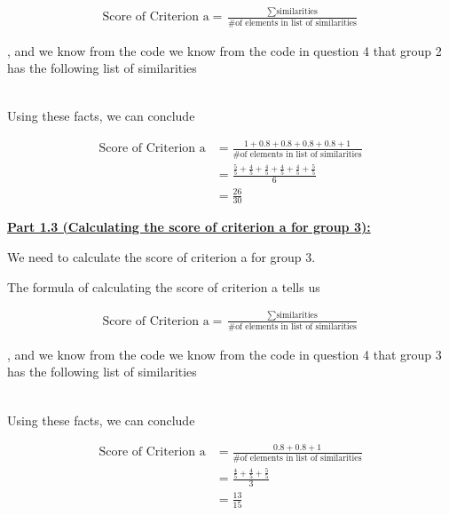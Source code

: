 \documentclass[12pt]{article}
\begin{document}
\begin{itemize}
    \begin{align}
        \text{Score of Criterion a} = \frac{\sum \text{similarities}}{\text{\# of elements in list of similarities}}
    \end{align}

    , and we know from the code we know from the code in question 4 that group 2 has the following
    list of similarities

    \begin{align}
        [1,0.8,0.8,0.8,0.8,1]
    \end{align}

    \bigskip

    Using these facts, we can conclude

    \begin{align}
        \text{Score of Criterion a} &= \frac{1 + 0.8 + 0.8 + 0.8 + 0.8 + 1}{\text{\# of elements in list of similarities}}\\
        &= \frac{\frac{5}{5} + \frac{4}{5} + \frac{4}{5} + \frac{4}{5} + \frac{4}{5} + \frac{5}{5}}{6}\\
        &= \frac{26}{30}
    \end{align}

    \bigskip

    \underline{\textbf{Part 1.3 (Calculating the score of criterion a for group 3):}}

    \bigskip

    We need to calculate the score of criterion a for group 3.

    \bigskip

    The formula of calculating the score of criterion a tells us

    \begin{align}
        \text{Score of Criterion a} = \frac{\sum \text{similarities}}{\text{\# of elements in list of similarities}}
    \end{align}

    , and we know from the code we know from the code in question 4 that group 3 has the following
    list of similarities

    \begin{align}
        [0.8,0.8,1]
    \end{align}

    \bigskip

    Using these facts, we can conclude

    \begin{align}
        \text{Score of Criterion a} &= \frac{0.8 + 0.8 + 1}{\text{\# of elements in list of similarities}}\\
        &= \frac{\frac{4}{5} + \frac{4}{5} + \frac{5}{5}}{3}\\
        &= \frac{13}{15}
    \end{align}


\end{itemize}
\end{document}
